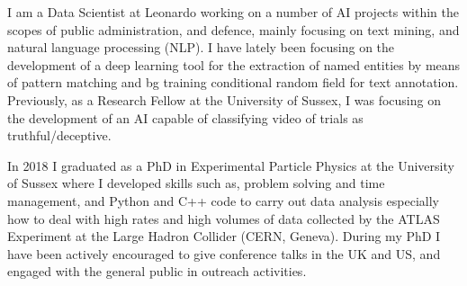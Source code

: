 
I am a Data Scientist at Leonardo working on a number of AI projects within the scopes of public administration, and defence, mainly focusing on text mining, and natural language processing (NLP). I have lately been focusing on the development of a deep learning tool for the extraction of named entities by means of pattern matching and bg training conditional random field for text annotation. Previously, as a Research Fellow at the University of Sussex, I was focusing on the development of an AI capable of classifying video of trials as truthful/deceptive. 

In 2018 I graduated as a PhD in Experimental Particle Physics at the University of Sussex where I developed skills such as, problem solving and time management, and Python and C++ code to carry out data analysis especially how to deal with high rates and high volumes of data collected by the ATLAS Experiment at the Large Hadron Collider (CERN, Geneva). During my PhD I have been actively encouraged to give conference talks in the UK and US, and engaged with the general public in outreach activities.